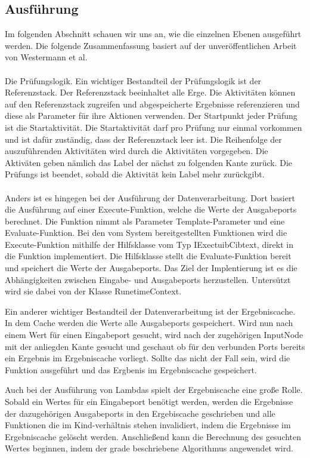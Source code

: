 \documentclass{article}
\begin{document}
    \subsection{Ausführung}
    Im folgenden Abschnitt schauen wir uns an, wie die einzelnen Ebenen ausgeführt werden.
    Die folgende Zusammenfassung basiert auf der unveröffentlichen Arbeit von Westermann et al.\\\\
    Die Prüfungslogik. 
    Ein wichtiger Bestandteil der Prüfungslogik ist der Referenzstack. Der Referenzstack beeinhaltet alle Erge.
    Die Aktivitäten können auf den Referenzstack zugreifen und abgespeicherte Ergebnisse referenzieren und diese als Parameter für ihre Aktionen verwenden.
    Der Startpunkt jeder Prüfung ist die Startaktivität. Die Startaktivität darf pro Prüfung nur einmal vorkommen und ist dafür zuständig, dass der Referenzstack leer ist.
    Die Reihenfolge der auszuführenden Aktivitäten wird durch die Aktivitäten vorgegeben. Die Aktiväten geben nämlich das Label der nächst zu folgenden Kante zurück. 
    Die Prüfungs ist beendet, sobald die Aktivität kein Label mehr zurückgibt.\\\\
    Anders ist es hingegen bei der Ausführung der Datenverarbeitung. Dort basiert die Ausführung auf einer Execute-Funktion, welche die Werte der Ausgabeports berechnet.
    Die Funktion nimmt als Parameter Template-Parameter und eine Evaluate-Funktion.
    Bei den vom System bereitgestellten Funktionen wird die Execute-Funktion mithilfe der Hilfsklasse vom Typ IExectuibCibtext, direkt in die Funktion implementiert.
    Die Hilfsklasse stellt die Evaluate-Funktion bereit und speichert die Werte der Ausgabeports.
    Das Ziel der Implentierung ist es die Abhängigkeiten zwischen Eingabe- und Ausgabeports herzustellen. Untersützt wird sie dabei von der Klasse RunetimeContext.

    Ein anderer wichtiger Bestandteil der Datenverarbeitung ist der Ergebniscache. In dem Cache werden die Werte alle Ausgabeports gespeichert.
    Wird nun nach einem Wert für einen Eingabeport gesucht, wird nach der zugehörigen InputNode mit der anliegden Kante gesucht und geschaut ob für den verbunden Ports bereits ein Ergebnis im Ergebniscache vorliegt.
    Sollte das nicht der Fall sein, wird die Funktion ausgeführt und das Ergbenis im Ergebniscache gespeichert.

    Auch bei der Ausführung von Lambdas spielt der Ergebniscache eine große Rolle. Sobald ein Wertes für ein Eingabeport benötigt werden, werden die Ergebnisse der dazugehörigen Ausgabeports in den Ergebiscache geschrieben und alle Funktionen die im Kind-verhältnis stehen invalidiert, indem die Ergebnisse im Ergebniscache gelöscht werden.
    Anschließend kann die Berechnung des gesuchten Wertes beginnen, indem der grade beschriebene Algorithmus angewendet wird.\\
\end{document}
